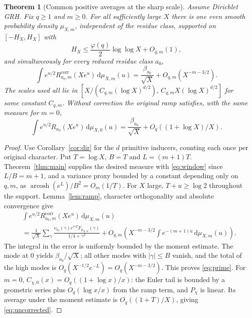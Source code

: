 \documentclass[11pt,letterpaper]{article}
\newtheorem{theorem}{Theorem}[section]
\theoremstyle{remark}\newtheorem{remark}[theorem]{Remark}
\newcommand{\dd}{\,\mathrm d}\newcommand{\sinc}{\operatorname{sinc}}
\newcommand{\arcosh}{\operatorname{arcosh}}\newcommand{\sech}{\operatorname{sech}}
\begin{document}
\begin{theorem}[Common positive averages at the sharp scale]\label{thm:prime}
Assume Dirichlet GRH. Fix $q\ge1$ and $m\ge0$. For all sufficiently large $X$ there is one even smooth probability density $\mu_{X,m}$, independent of the residue class, supported on $[-H_X,H_X]$ with
\begin{equation}\label{eq:window}
 H_X\le \frac{\varphi(q)}2\log\log X+O_{q,m}(1),
\end{equation}
and simultaneously for every reduced residue class $a_0$,
\begin{equation}\label{eq:prime}
 \int e^{u/2}R^{\mathrm{corr}}_{a_0,m}(Xe^u)\dd\mu_{X,m}(u)
 =\frac{\beta_{a_0}}{\sqrt X}+O_{q,m}(X^{-m-3/2}).
\end{equation}
The scales used all lie in $[X/(C_{q,m}(\log X)^{d/2}),\,C_{q,m}X(\log X)^{d/2}]$ for some constant $C_{q,m}$. Without correction the original ramp satisfies, with the same measure for $m=0$,
\begin{equation}\label{eq:uncorrected}
 \int e^{u/2}R_{a_0}(Xe^u)\dd\mu_{X,0}(u)=\frac{\beta_{a_0}}{\sqrt X}+O_q((1+\log X)/X).
\end{equation}
\end{theorem}
\begin{proof}
Use Corollary~\ref{cor:dir} for the $d$ primitive inducers, counting each once per original character. Put $T=\log X$, $B=T$ and $L=(m+1)T$. Theorem~\ref{thm:main} supplies the desired measure with \eqref{eq:window} since $L/B=m+1$, and a variance proxy bounded by a constant depending only on $q,m$, as $\arcosh(e^L)/B^2=O_m(1/T)$. For $X$ large, $T+u\ge\log 2$ throughout the support. Lemma~\ref{lem:ramp}, character orthogonality and absolute convergence give
\begin{align*}
 &\int e^{u/2}R^{\mathrm{corr}}_{a_0,m}(Xe^u)\dd\mu_{X,m}(u)\\
 &=\frac1{\sqrt X}\sum_\gamma
 \frac{v_{a_0}(\gamma)e^{i\gamma T}F_{\mu_{X,m}}(\gamma)}{1/4+\gamma^2}
 +O_{q,m}\left(X^{-m-3/2}\int e^{-(m+1)u}\dd\mu_{X,m}(u)\right).
\end{align*}
The integral in the error is uniformly bounded by the moment estimate. The mode at $0$ yields $\beta_{a_0}/\sqrt X$; all other modes with $|\gamma|\le B$ vanish, and the total of the high modes is $O_q(X^{-1/2}e^{-L})=O_q(X^{-m-3/2})$. This proves \eqref{eq:prime}. For $m=0$, $C_{\chi,0}(x)=O_q((1+\log x)/x)$: the Euler tail is bounded by a geometric series plus $O_q(\log x/x)$ from the ramp term, and $P_\chi$ is linear. Its average under the moment estimate is $O_q((1+T)/X)$, giving \eqref{eq:uncorrected}.
\end{proof}
\end{document}
